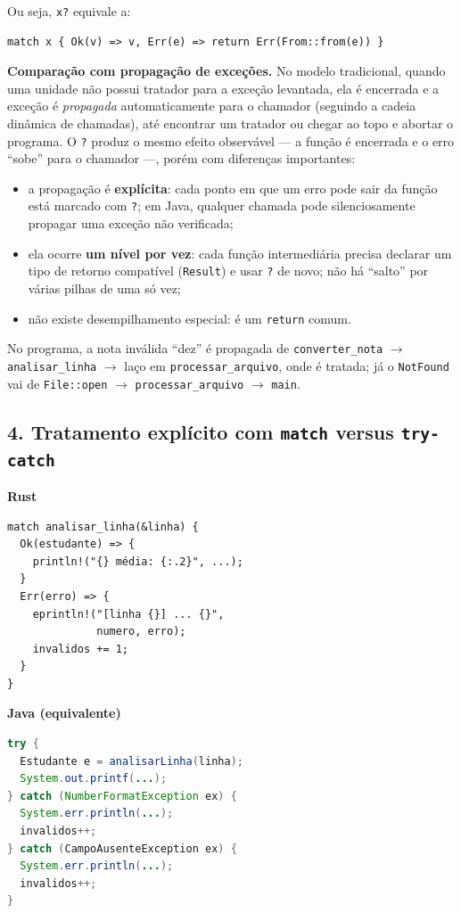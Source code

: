 \documentclass[11pt,a4paper]{article}
\newcommand{\code}[1]{\texttt{#1}}
\begin{document}
Ou seja, \code{x?} equivale a:
\begin{lstlisting}[numbers=none]
match x { Ok(v) => v, Err(e) => return Err(From::from(e)) }
\end{lstlisting}

\textbf{Comparação com propagação de exceções.} No modelo tradicional,
quando uma unidade não possui tratador para a exceção levantada, ela é
encerrada e a exceção é \emph{propagada} automaticamente para o chamador
(seguindo a cadeia dinâmica de chamadas), até encontrar um tratador
ou chegar ao topo e abortar o programa. O \code{?} produz o mesmo efeito
observável --- a função é encerrada e o erro ``sobe'' para o chamador ---,
porém com diferenças importantes:
\begin{itemize}
  \item a propagação é \textbf{explícita}: cada ponto em que um erro pode
    sair da função está marcado com \code{?}; em Java, qualquer chamada
    pode silenciosamente propagar uma exceção não verificada;
  \item ela ocorre \textbf{um nível por vez}: cada função intermediária
    precisa declarar um tipo de retorno compatível (\code{Result}) e usar
    \code{?} de novo; não há ``salto'' por várias pilhas de uma só vez;
  \item não existe desempilhamento especial: é um \code{return} comum.
\end{itemize}
No programa, a nota inválida ``dez'' é propagada de \code{converter\_nota}
$\to$ \code{analisar\_linha} $\to$ laço em \code{processar\_arquivo}, onde
é tratada; já o \code{NotFound} vai de \code{File::open} $\to$
\code{processar\_arquivo} $\to$ \code{main}.

\subsection*{4. Tratamento explícito com \code{match} versus \code{try-catch}}

\begin{minipage}[t]{0.49\linewidth}
\textbf{Rust}
\begin{lstlisting}[numbers=none,basicstyle=\ttfamily\scriptsize]
match analisar_linha(&linha) {
  Ok(estudante) => {
    println!("{} média: {:.2}", ...);
  }
  Err(erro) => {
    eprintln!("[linha {}] ... {}",
              numero, erro);
    invalidos += 1;
  }
}
\end{lstlisting}
\end{minipage}\hfill
\begin{minipage}[t]{0.49\linewidth}
\textbf{Java (equivalente)}
\begin{lstlisting}[numbers=none,language=Java,basicstyle=\ttfamily\scriptsize]
try {
  Estudante e = analisarLinha(linha);
  System.out.printf(...);
} catch (NumberFormatException ex) {
  System.err.println(...);
  invalidos++;
} catch (CampoAusenteException ex) {
  System.err.println(...);
  invalidos++;
}
\end{lstlisting}
\end{minipage}
\end{document}
